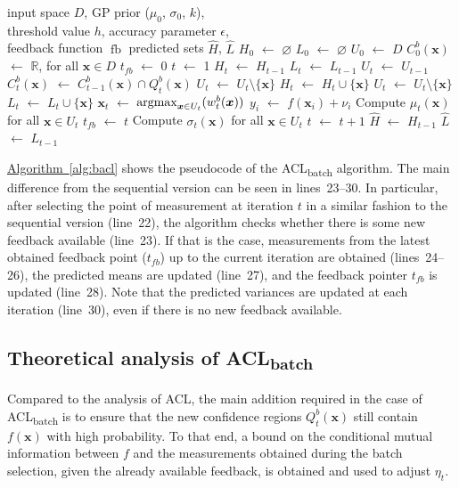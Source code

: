 \documentclass{article}
\def\*#1{\bm{#1}}
\newcommand*\LET[2]{\STATE #1 $\gets$ #2}
\newcommand{\algoref}[1]{\hyperref[#1]{\mbox{Algorithm~\ref*{#1}}}}
\newcommand{\argmax}{\operatornamewithlimits{argmax}}
\newcommand{\acl}{\textsf{ACL}\xspace}
\newcommand{\bacl}{\textsf{ACL\textsubscript{batch}}\xspace}
\newcommand{\fb}{\mathop{\mathrm{fb}}}
\begin{document}
\begin{algorithm}[!t]
  \caption{The \bacl algorithm}
  \label{alg:bacl}
\begin{algorithmic}[1]
  \REQUIRE input space $D$, GP prior ($\mu_0$, $\sigma_0$, $k$),\\
           \hspace{1.9em}threshold value $h$, accuracy parameter $\epsilon$,\\
           \hspace{1.9em}feedback function $\fb$
  \ENSURE predicted sets $\hat{H}$, $\hat{L}$
  \LET{$H_0$}{$\varnothing$}
  \LET{$L_0$}{$\varnothing$}
  \LET{$U_0$}{$D$}
  \LET{$C_0^b(\*x)$}{$\mathbb{R}$, for all $\*x \in D$}
  \LET{$t_{fb}$}{0}
  \LET{$t$}{1}
    \LET{$H_t$}{$H_{t-1}$}
    \LET{$L_t$}{$L_{t-1}$}
    \LET{$U_t$}{$U_{t-1}$}
    \FORALL{$\*x \in U_{t-1}$}
      \LET{$C_{t}^{b}(\*x)$}{$C_{t-1}^{b}(\*x) \cap Q_t^{b}(\*x)$}
      \IF{$\min(C_t^{b}(\*x)) + \epsilon \geq h$}
        \LET{$U_t$}{$U_t \setminus \{\*x\}$}
        \LET{$H_t$}{$H_t \cup \{\*x\}$}
      \ELSIF{$\max(C_t^{b}(\*x)) - \epsilon \leq h$}
        \LET{$U_t$}{$U_t \setminus \{\*x\}$}
        \LET{$L_t$}{$L_t \cup \{\*x\}$}
      \ENDIF
    \ENDFOR
    \LET{$\*x_t$}{$\argmax_{\*x \in U_t}(w_t^{b}(\*x))$}
    \IF{$\fb[t+1] > t_{fb}$}
        \LET{$y_i$}{$f(\*x_i) + \nu_i$}
      \ENDFOR
      \STATE Compute $\mu_t(\*x)$ for all $\*x \in U_t$
      \LET{$t_{fb}$}{$t$}
    \ENDIF
    \STATE Compute $\sigma_t(\*x)$ for all $\*x \in U_t$
    \LET{$t$}{$t + 1$}
  \ENDWHILE
  \LET{$\hat{H}$}{$H_{t-1}$}
  \LET{$\hat{L}$}{$L_{t-1}$}
\end{algorithmic}
\end{algorithm}

\algoref{alg:bacl} shows the pseudocode of the \bacl algorithm. The main
difference from the sequential version can be seen in lines~23--30.
In particular, after selecting the point of measurement at iteration $t$
in a similar fashion to the sequential version (line~22), the algorithm
checks whether there is some new feedback available (line~23). If that
is the case, measurements from the latest obtained feedback point ($t_{fb}$)
up to the current iteration are obtained (lines~24--26), the predicted
means are updated (line~27), and the feedback pointer $t_{fb}$
is updated (line~28). Note that the predicted variances are updated at
each iteration (line~30), even if there is no new feedback available.

\subsection{Theoretical analysis of \bacl}
Compared to the analysis of \acl, the main addition required in the case of
\bacl is to ensure that the new confidence regions $Q_t^b(\*x)$ still
contain $f(\*x)$ with high probability. To that end, a bound on the
conditional mutual information between $f$ and the measurements
obtained during the batch selection, given the already available feedback,
is obtained and used to adjust $\eta_t$.
\end{document}
